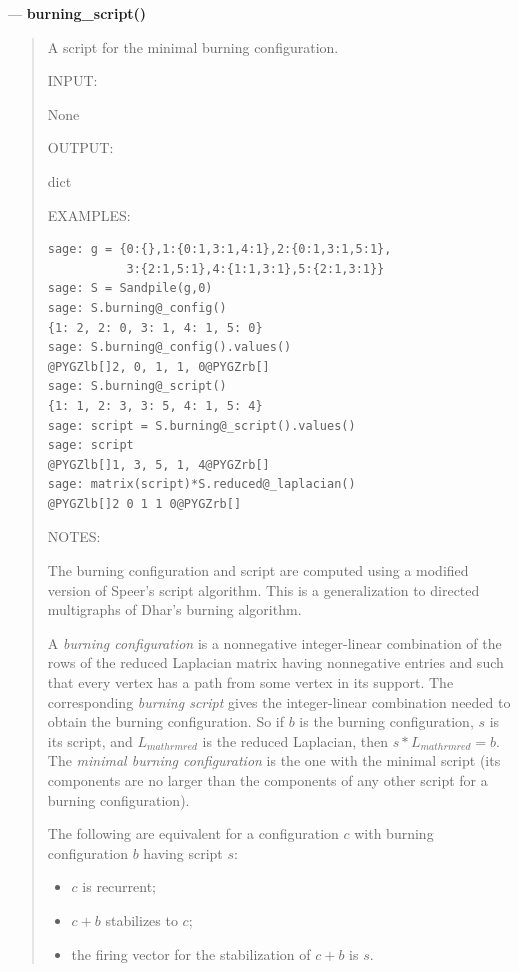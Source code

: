 \documentclass[letterpaper,10pt,english]{manual}
\begin{document}
---
\hypertarget{burning-script}{}
\textbf{burning\_script()}
\begin{quote}

A script for the minimal burning configuration.

INPUT:

None

OUTPUT:

dict

EXAMPLES:

\begin{Verbatim}[commandchars=@\[\]]
sage: g = {0:{},1:{0:1,3:1,4:1},2:{0:1,3:1,5:1},
           3:{2:1,5:1},4:{1:1,3:1},5:{2:1,3:1}}
sage: S = Sandpile(g,0)
sage: S.burning@_config()
{1: 2, 2: 0, 3: 1, 4: 1, 5: 0}
sage: S.burning@_config().values()
@PYGZlb[]2, 0, 1, 1, 0@PYGZrb[]
sage: S.burning@_script()
{1: 1, 2: 3, 3: 5, 4: 1, 5: 4}
sage: script = S.burning@_script().values()
sage: script
@PYGZlb[]1, 3, 5, 1, 4@PYGZrb[]
sage: matrix(script)*S.reduced@_laplacian()
@PYGZlb[]2 0 1 1 0@PYGZrb[]
\end{Verbatim}

NOTES:

The burning configuration and script are computed using a modified
version of Speer's script algorithm.  This is a generalization to
directed multigraphs of Dhar's burning algorithm.

A \emph{burning configuration} is a nonnegative integer-linear
combination of the rows of the reduced Laplacian matrix having
nonnegative entries and such that every vertex has a path from some
vertex in its support.  The corresponding \emph{burning script} gives the
integer-linear combination needed to obtain the burning configuration.
So if $b$ is the burning configuration, $s$ is its script, and
$L_{mathrm{red}}$ is the reduced Laplacian, then $s *
L_{mathrm{red}}= b$.  The \emph{minimal burning configuration} is the one
with the minimal script (its components are no larger than the
components of any other script
for a burning configuration).

The following are equivalent for a configuration $c$ with burning
configuration $b$ having script $s$:
\begin{itemize}
\item {} 
$c$ is recurrent;

\item {} 
$c+b$ stabilizes to $c$;

\item {} 
the firing vector for the stabilization of $c+b$ is $s$.

\end{itemize}
\end{quote}
\end{document}
